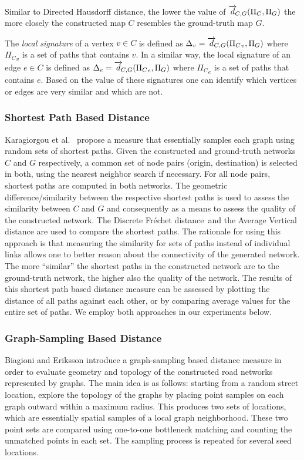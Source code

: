 \documentclass[natbib]{svjour3}                    \smartqed  \usepackage[table]{xcolor}
\newcommand{\distance}[4]{\overrightarrow{d}_{\hspace*{-.5ex}#1,#2}(#3,#4)}
\newcommand{\Frd}{Fr\'echet distance}
\begin{document}
Similar to Directed Hausdorff distance, the lower the value of $\distance{C}{G}{\Pi_C}{\Pi_G}$ the more closely the constructed map $C$ resembles the ground-truth map $G$.

The {\em local signature} of a vertex $v\in C$ is defined as $\Delta_{v}=\distance{C}{G}{{\Pi_C}_v}{\Pi_G}$ where ${\Pi_C}_v$ is a set of paths that contains $v$. In a similar way, the local signature of
an edge $e\in C$ is defined as $\Delta_{e}=\distance{C}{G}{{\Pi_C}_e}{\Pi_G}$ where ${\Pi_C}_e$ is a set of paths that contains $e$. Based on the value of these signatures one can identify which vertices or edges are very similar and which are not.

\subsubsection{Shortest Path Based Distance \protect\cite{Karagiorgou:2012:VTD:2424321.2424334}}
Karagiorgou et al.~\cite{Karagiorgou:2012:VTD:2424321.2424334} propose a measure that essentially samples each graph using random sets of shortest paths.
Given the constructed and ground-truth networks $C$ and $G$ respectively, a common set of node pairs (origin, destination) is selected in both, using the nearest neighbor search if necessary. For all node pairs, shortest paths are computed in both networks. The geometric difference/similarity between the respective shortest paths is used to assess the similarity between $C$ and $G$ and consequently as a means to assess the quality of the constructed network.
The Discrete \Frd\ and the Average Vertical distance are used to compare the shortest paths.
The rationale for using this approach is that measuring the similarity for sets of paths instead of individual links allows one to better reason about the connectivity of the generated network. The more ``similar'' the shortest paths in the constructed network are to the ground-truth network, the higher also the quality of the network.
The results of this shortest path based distance measure can be assessed by plotting the distance of all paths against each other, or by comparing average values for the entire set of paths. We employ both approaches in our experiments below.

\subsubsection{Graph-Sampling Based Distance \protect\cite{be-irmgp-12}}
Biagioni and Eriksson \cite{be-irmgp-12} introduce a graph-sampling based distance measure in order to evaluate geometry and topology of the constructed road networks represented by graphs. The main idea is as follows: starting from a random street location, explore the topology of the graphs by placing point samples on each graph outward within a maximum radius. This produces two sets of locations, which are essentially spatial samples of a local graph neighborhood. These two point sets are compared using one-to-one bottleneck matching and counting the unmatched points in each set. The sampling process is repeated for several seed locations.
\end{document}
